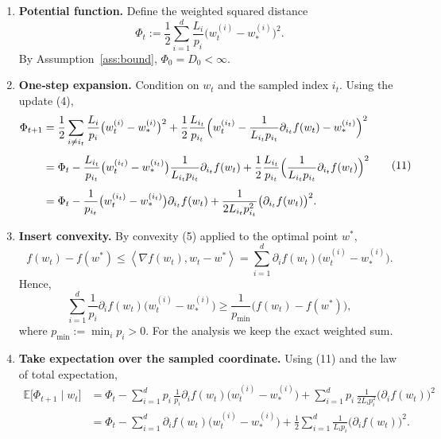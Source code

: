 \documentclass[11pt]{article}
\newcommand{\E}{\mathbb{E}}
\newcommand{\ip}[2]{\left\langle #1,#2\right\rangle}
\begin{document}
\begin{enumerate}[label=[Step \arabic*], leftmargin=*, align=left]
\item \textbf{Potential function.} Define the weighted squared distance
\[
    \Phi_{t}:=\frac12\sum_{i=1}^{d}\frac{L_{i}}{p_{i}}\bigl(w_{t}^{(i)}-w_{*}^{(i)}\bigr)^{2}.
\tag{10}
\]
By Assumption~\ref{ass:bound}, \(\Phi_{0}=D_{0}<\infty\).

\item \textbf{One‑step expansion.} Condition on \(w_{t}\) and the sampled index \(i_{t}\). Using the update (4),
\[
\begin{aligned}
\Phi_{t+1}
&=\frac12\sum_{i\neq i_{t}}\frac{L_{i}}{p_{i}}\bigl(w_{t}^{(i)}-w_{*}^{(i)}\bigr)^{2}
   +\frac12\frac{L_{i_{t}}}{p_{i_{t}}}\Bigl(w_{t}^{(i_{t})}-\frac{1}{L_{i_{t}}p_{i_{t}}}\partial_{i_{t}}f(w_{t})-w_{*}^{(i_{t})}\Bigr)^{2}\\[4pt]
&=\Phi_{t}
   -\frac{L_{i_{t}}}{p_{i_{t}}}\bigl(w_{t}^{(i_{t})}-w_{*}^{(i_{t})}\bigr)\frac{1}{L_{i_{t}}p_{i_{t}}}\partial_{i_{t}}f(w_{t})
   +\frac12\frac{L_{i_{t}}}{p_{i_{t}}}\Bigl(\frac{1}{L_{i_{t}}p_{i_{t}}}\partial_{i_{t}}f(w_{t})\Bigr)^{2}\\[4pt]
&=\Phi_{t}
   -\frac{1}{p_{i_{t}}}\bigl(w_{t}^{(i_{t})}-w_{*}^{(i_{t})}\bigr)\partial_{i_{t}}f(w_{t})
   +\frac{1}{2L_{i_{t}}p_{i_{t}}^{2}}\bigl(\partial_{i_{t}}f(w_{t})\bigr)^{2}.
\end{aligned}
\tag{11}
\]

\item \textbf{Insert convexity.} By convexity (5) applied to the optimal point \(w^{*}\),
\[
    f(w_{t})-f(w^{*})\le\ip{\nabla f(w_{t})}{w_{t}-w^{*}}
    =\sum_{i=1}^{d}\partial_{i}f(w_{t})\bigl(w_{t}^{(i)}-w_{*}^{(i)}\bigr).
\tag{12}
\]
Hence,
\[
    \sum_{i=1}^{d}\frac{1}{p_{i}}\partial_{i}f(w_{t})\bigl(w_{t}^{(i)}-w_{*}^{(i)}\bigr)
    \ge \frac{1}{p_{\min}}\bigl(f(w_{t})-f(w^{*})\bigr),
\tag{13}
\]
where \(p_{\min}:=\min_{i}p_{i}>0\). For the analysis we keep the exact weighted sum.

\item \textbf{Take expectation over the sampled coordinate.} Using (11) and the law of total expectation,
\[
\begin{aligned}
\E\bigl[\Phi_{t+1}\mid w_{t}\bigr]
&=\Phi_{t}
   -\sum_{i=1}^{d}p_{i}\,\frac{1}{p_{i}}\partial_{i}f(w_{t})\bigl(w_{t}^{(i)}-w_{*}^{(i)}\bigr)
   +\sum_{i=1}^{d}p_{i}\,\frac{1}{2L_{i}p_{i}^{2}}\bigl(\partial_{i}f(w_{t})\bigr)^{2}\\[4pt]
&=\Phi_{t}
   -\sum_{i=1}^{d}\partial_{i}f(w_{t})\bigl(w_{t}^{(i)}-w_{*}^{(i)}\bigr)
   +\frac12\sum_{i=1}^{d}\frac{1}{L_{i}p_{i}}\bigl(\partial_{i}f(w_{t})\bigr)^{2}.
\end{aligned}
\tag{14}
\]


\end{enumerate}
\end{document}
